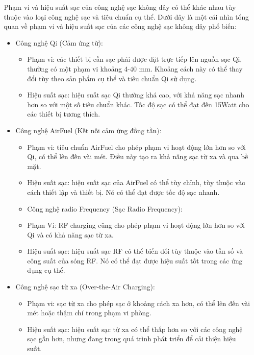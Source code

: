 \documentclass{article} %
\begin{document}
Phạm vi và hiệu suất sạc của công nghệ sạc không dây có thể khác nhau tùy thuộc vào loại công nghệ sạc và tiêu chuẩn cụ thể. Dưới đây là một cái nhìn tổng quan về phạm vi và hiệu suất sạc của các công nghệ sạc không dây phổ biến:
\begin{itemize}
    \item  Công nghệ Qi (Cảm ứng từ):	
\begin{itemize}
    \item Phạm vi: các thiết bị cần sạc phải được đặt trực tiếp lên nguồn sạc Qi, thường có một phạm vi khoảng 4-40 mm. Khoảng cách này có thể thay đổi tùy theo sản phẩm cụ thể và tiêu chuẩn Qi sử dụng.
\item Hiệu suất sạc: hiệu suất sạc Qi thường khá cao, với khả năng sạc nhanh hơn so với một số tiêu chuẩn khác. Tốc độ sạc có thể đạt đến 15Watt cho các thiết bị tương thích.
\end{itemize}
    \item  Công nghệ AirFuel (Kết nối cảm ứng đồng tần):
\begin{itemize}
    \item Phạm vi: tiêu chuẩn AirFuel cho phép phạm vi hoạt động lớn hơn so với Qi, có thể lên đến vài mét. Điều này tạo ra khả năng sạc từ xa và qua bề mặt.
\item Hiệu suất sạc: hiệu suất sạc của AirFuel có thể tùy chỉnh, tùy thuộc vào cách thiết lập và thiết bị. Nó có thể đạt được tốc độ sạc nhanh.
    \item  Công nghệ radio Frequency (Sạc Radio Frequency):
\item Phạm Vi: RF charging cũng cho phép phạm vi hoạt động lớn hơn so với Qi và có khả năng sạc từ xa.
\item Hiệu suất sạc: hiệu suất sạc RF có thể biến đổi tùy thuộc vào tần số và công suất của sóng RF. Nó có thể đạt được hiệu suất tốt trong các ứng dụng cụ thể.
\end{itemize}
    \item  Công nghệ sạc từ xa (Over-the-Air Charging):
\begin{itemize}
    \item Phạm vi: sạc từ xa cho phép sạc ở khoảng cách xa hơn, có thể lên đến vài mét hoặc thậm chí trong phạm vi phòng.
\item Hiệu suất sạc: hiệu suất sạc từ xa có thể thấp hơn so với các công nghệ sạc gần hơn, nhưng đang trong quá trình phát triển để cải thiện hiệu suất.
\end{itemize}

\end{itemize}
\end{document}
